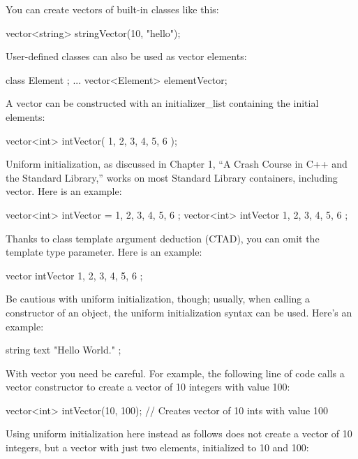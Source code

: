 You can create vectors of built-in classes like this:

\begin{cpp}
vector<string> stringVector(10, "hello");
\end{cpp}

User-defined classes can also be used as vector elements:

\begin{cpp}
class Element { };
...
vector<Element> elementVector;
\end{cpp}

A vector can be constructed with an initializer\_list containing the initial elements:

\begin{cpp}
vector<int> intVector({ 1, 2, 3, 4, 5, 6 });
\end{cpp}

Uniform initialization, as discussed in Chapter 1, “A Crash Course in C++ and the Standard Library,” works on most Standard Library containers, including vector. Here is an example:

\begin{cpp}
vector<int> intVector = { 1, 2, 3, 4, 5, 6 };
vector<int> intVector { 1, 2, 3, 4, 5, 6 };
\end{cpp}

Thanks to class template argument deduction (CTAD), you can omit the template type parameter. Here is an example:

\begin{cpp}
vector intVector { 1, 2, 3, 4, 5, 6 };
\end{cpp}

Be cautious with uniform initialization, though; usually, when calling a constructor of an object, the uniform initialization syntax can be used. Here’s an example:

\begin{cpp}
string text { "Hello World." };
\end{cpp}

With vector you need be careful. For example, the following line of code calls a vector constructor to create a vector of 10 integers with value 100:

\begin{cpp}
vector<int> intVector(10, 100); // Creates vector of 10 ints with value 100
\end{cpp}

Using uniform initialization here instead as follows does not create a vector of 10 integers, but a vector with just two elements, initialized to 10 and 100:

